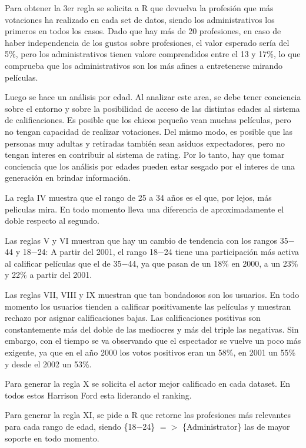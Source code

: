 \documentclass[journal]{IEEEtran}
\begin{document}
Para obtener la 3er regla se solicita a R que devuelva la profesión que más votaciones 
ha realizado en cada set de datos, siendo los administrativos los primeros en todos los casos.
Dado que hay más de 20 profesiones, en caso de haber independencia de los gustos sobre profesiones, 
el valor esperado sería del 5\%, pero los administrativos tienen valore comprendidos entre el
13 y 17\%, lo que comprueba que los administrativos son los más afines a entretenerse mirando
películas.

Luego se hace un análisis por edad. Al analizar este area, se debe tener conciencia
sobre el entorno y sobre la posibilidad de acceso de las distintas edades al sistema de calificaciones.
Es posible que los chicos pequeño vean muchas películas, pero no tengan capacidad
de realizar votaciones. Del mismo modo, es posible que las personas muy adultas y
retiradas también sean asiduos expectadores, pero no tengan  interes en contribuir al sistema
de rating. Por lo tanto, hay que tomar conciencia que los análisis por edades pueden estar
sesgado por el interes de una generación en brindar información.

 La regla IV muestra
que el rango de 25 a 34 años es el que, por lejos, más peliculas mira. En todo momento
lleva una diferencia de aproximadamente el doble respecto al segundo.

Las reglas V y VI muestran que hay un cambio de tendencia con los rangos 35$-$44 y
18$-$24: A partir del 2001, el rango 18$-$24 tiene una participación más activa
al calificar películas que el de 35$-$44, ya que pasan de un 18\% en 2000, a
un 23\% y 22\% a partir del 2001.

Las reglas VII, VIII y IX muestran que tan bondadosos son los usuarios. En todo
momento los usuarios tienden a calificar positivamente las películas y muestran
rechazo por asignar calificaciones bajas. Las calificaciones positivas son 
constantemente más del doble de las mediocres y más del triple las negativas.
Sin  embargo, con el tiempo se va observando que el espectador se vuelve un
poco más exigente, ya que en el año 2000 los votos positivos eran un 58\%, en
2001 un 55\% y desde el 2002 un 53\%.

Para generar la regla X se solicita el actor mejor calificado en cada dataset.
En todos estos Harrison Ford esta liderando el ranking. 

Para generar la regla XI, se pide a R que retorne las profesiones más relevantes
para cada rango de edad, siendo \{18$-$24\} $=$$>$ \{Administrator\} las de 
mayor soporte en todo momento.
\end{document}

